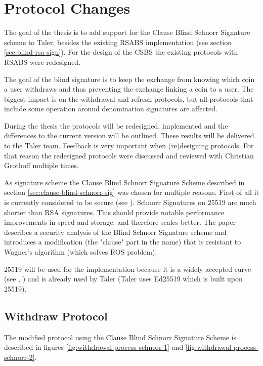 \section{Protocol Changes}
The goal of the thesis is to add support for the Clause Blind Schnorr Signature scheme to Taler, besides the existing \gls{RSABS} implementation (see section \ref{sec:blind-rsa-sign}).
For the design of the \gls{CSBS} the existing protocols with \gls{RSABS} were redesigned.

The goal of the blind signature is to keep the exchange from knowing which coin a user withdraws and thus preventing the exchange linking a coin to a user.
The biggest impact is on the withdrawal and refresh protocols, but all protocols that include some operation around denomination signatures are affected.

During the thesis the protocols will be redesigned, implemented and the differences to the current version will be outlined.
These results will be delivered to the Taler team.
Feedback is very important when (re)designing protocols.
For that reason the redesigned protocols were discussed and reviewed with Christian Grothoff multiple times.

As signature scheme the Clause Blind Schnorr Signature Scheme described in section \ref{sec:clause-blind-schnorr-sig} was chosen for multiple reasons.
First of all it is currently considered to be secure (see \cite{cryptoeprint:2019:877}).
Schnorr Signatures on \gls{25519} are much shorter than RSA signatures.
This should provide notable performance improvements in speed and storage, and therefore scales better.
The paper describes a security analysis of the Blind Schnorr Signature scheme and introduces a modification (the "clause" part in the name) that is resistant to Wagner's algorithm (which solves ROS problem).

\Gls{25519} \cite{bern:curve25519} will be used for the implementation because it is a widely accepted curve (see \cite{bernlange:safecurves}, \cite{rfc7748}) and is already used by Taler (Taler uses Ed25519 which is built upon \gls{25519}).


\subsection{Withdraw Protocol}
\label{sec:withdraw-protocol-schnorr}
The modified protocol using the Clause Blind Schnorr Signature Scheme is described in figures \ref{fig:withdrawal-process-schnorr-1} and \ref{fig:withdrawal-process-schnorr-2}.

